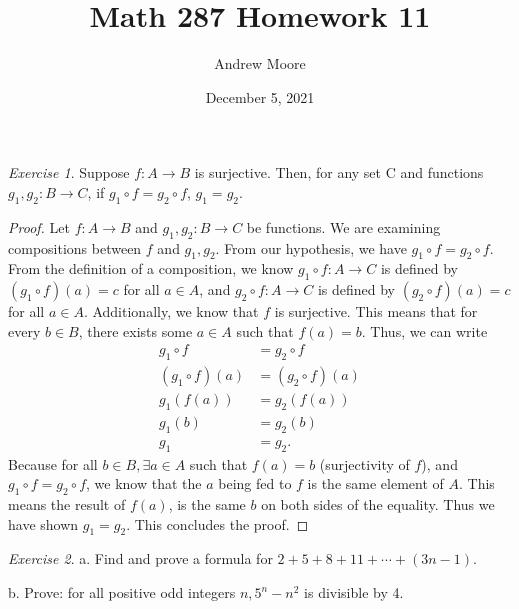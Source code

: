 \documentclass[12pt,oneside]{amsart}
\title{Math 287 Homework 11}
\author{Andrew Moore}
\date{December 5, 2021} %
\theoremstyle{remark}
\newtheorem{exer}{Exercise}
\begin{document}
\maketitle

\begin{exer}
Suppose $f: A \to B$ is surjective. Then, for any set C and functions $g_1, g_2 : B \to C$, if $g_1 \circ f = g_2 \circ f$, $g_1 = g_2$.
\end{exer}

\begin{proof}
Let $f: A \to B$ and $g_1, g_2 : B \to C$ be functions. We are examining compositions between $f$ and $g_1, g_2$. From our hypothesis, we have $g_1 \circ f = g_2 \circ f$. From the definition of a composition, we know $g_1 \circ f: A \to C$ is defined by $(g_1 \circ f)(a) = c$ for all $a \in A$, and $g_2 \circ f: A \to C$ is defined by $(g_2 \circ f)(a) = c$ for all $a \in A$. Additionally, we know that $f$ is surjective. This means that for every $b \in B$, there exists some $a \in A$ such that $f(a) = b$. Thus, we can write
\begin{align*}
     g_1 \circ f &= g_2 \circ f \tag{starting assumption} \\
(g_1 \circ f)(a) &= (g_2 \circ f)(a) \\
       g_1(f(a)) &= g_2(f(a)) \tag{definition of a composition} \\
          g_1(b) &= g_2(b) \\
             g_1 &= g_2.
\end{align*}
Because for all $b \in B, \exists a \in A$ such that $f(a) = b$ (surjectivity of $f$), and $g_1 \circ f = g_2 \circ f$, we know that the $a$ being fed to $f$ is the same element of $A$. This means the result of $f(a)$, is the same $b$ on both sides of the equality. Thus we have shown $g_1 = g_2$. This concludes the proof.
\end{proof}

\newpage
\begin{exer}
a. Find and prove a formula for $2 + 5 + 8 + 11 + \cdots + (3n - 1)$.


b. Prove: for all positive odd integers $n, 5^n - n^2$ is divisible by 4.

\end{exer}
\end{document}
